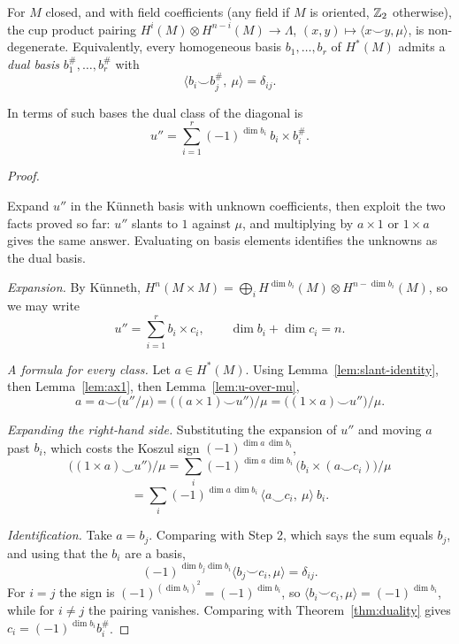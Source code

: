 \begin{theorem}\label{thm:duality}
For $M$ closed, and with field coefficients (any field if $M$ is oriented,
$\mathbb{Z}_2$ otherwise), the cup product pairing
$H^i(M)\otimes H^{n-i}(M)\to\Lambda$, $(x,y)\mapsto\langle x\smile y,\mu\rangle$,
is non-degenerate. Equivalently, every homogeneous basis $b_1,\dots,b_r$ of
$H^*(M)$ admits a \emph{dual basis} $b_1^\#,\dots,b_r^\#$ with
\[
\big\langle b_i\smile b_j^{\#},\ \mu\big\rangle=\delta_{ij}.
\]
\end{theorem}

\begin{theorem}\label{claim:diag-class-formula}
In terms of such bases the dual class of the diagonal is
\[
u''=\sum_{i=1}^{r}(-1)^{\dim b_i}\ b_i\times b_i^{\#}.
\]
\end{theorem}

\begin{proof}
\begin{strategy}
Expand $u''$ in the K\"unneth basis with unknown coefficients, then exploit the
two facts proved so far: $u''$ slants to $1$ against $\mu$, and multiplying by
$a\times1$ or $1\times a$ gives the same answer. Evaluating on basis elements
identifies the unknowns as the dual basis.
\end{strategy}

 \emph{Expansion.} By K\"unneth,
$H^n(M\times M)=\bigoplus_i H^{\dim b_i}(M)\otimes H^{n-\dim b_i}(M)$, so we may
write
\[
u''=\sum_{i=1}^{r} b_i\times c_i,
\qquad \dim b_i+\dim c_i=n .
\]

 \emph{A formula for every class.} Let $a\in H^*(M)$. Using
Lemma~\ref{lem:slant-identity}, then Lemma~\ref{lem:ax1}, then
Lemma~\ref{lem:u-over-mu},
\[
a=a\smile\big(u''/\mu\big)
=\big((a\times1)\smile u''\big)\big/\mu
=\big((1\times a)\smile u''\big)\big/\mu .
\]

 \emph{Expanding the right-hand side.} Substituting the expansion of
$u''$ and moving $a$ past $b_i$, which costs the Koszul sign
$(-1)^{\dim a\,\dim b_i}$,
\[
\big((1\times a)\smile u''\big)\big/\mu
=\sum_{i}(-1)^{\dim a\,\dim b_i}\,\big(b_i\times(a\smile c_i)\big)\big/\mu
\]
\[
=\sum_{i}(-1)^{\dim a\,\dim b_i}\,
\big\langle a\smile c_i,\ \mu\big\rangle\ b_i .
\]

 \emph{Identification.} Take $a=b_j$. Comparing with Step 2, which says
the sum equals $b_j$, and using that the $b_i$ are a basis,
\[
(-1)^{\dim b_j\dim b_i}\big\langle b_j\smile c_i,\mu\big\rangle=\delta_{ij}.
\]
For $i=j$ the sign is $(-1)^{(\dim b_i)^2}=(-1)^{\dim b_i}$, so
$\langle b_i\smile c_i,\mu\rangle=(-1)^{\dim b_i}$, while for $i\neq j$ the
pairing vanishes. Comparing with Theorem~\ref{thm:duality} gives
$c_i=(-1)^{\dim b_i}b_i^{\#}$.
\end{proof}

